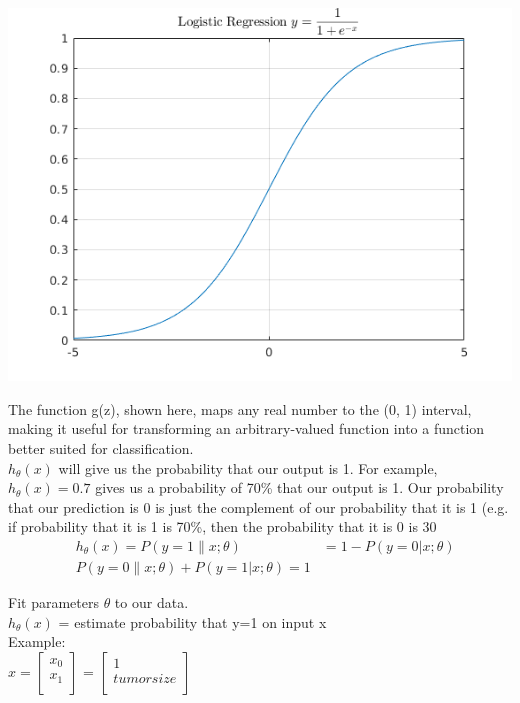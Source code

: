 \includegraphics{matlab/logistic_plot.png}

The function g(z), shown here, maps any real number to the (0, 1) interval, making it useful for transforming an arbitrary-valued function into a function better suited for classification.\\


$h_{\theta}(x)$ will give us the probability that our output is 1. For example, $h_\theta(x)=0.7$ gives us a probability of 70\% that our output is 1. Our probability that our prediction is 0 is just the complement of our probability that it is 1 (e.g. if probability that it is 1 is 70\%, then the probability that it is 0 is 30\\

\begin{equation}
  \begin{aligned}
  &h_\theta(x) = P(y=1 \| x ; \theta) &= 1 - P(y=0 | x ; \theta) \\
  &P(y = 0 \| x;\theta) + P(y = 1 | x ; \theta) = 1
  \end{aligned}
\end{equation}

Fit parameters $\theta$ to our data.\\
$h_{\theta}(x)$ = estimate probability that y=1 on input x\\


Example:\\
$
x =
\begin{bmatrix}
  x_{0} \\
  x_{1} \\
\end{bmatrix}
$ =
$
\begin{bmatrix}
  1 \\
  tumor size \\
\end{bmatrix}
$\\

